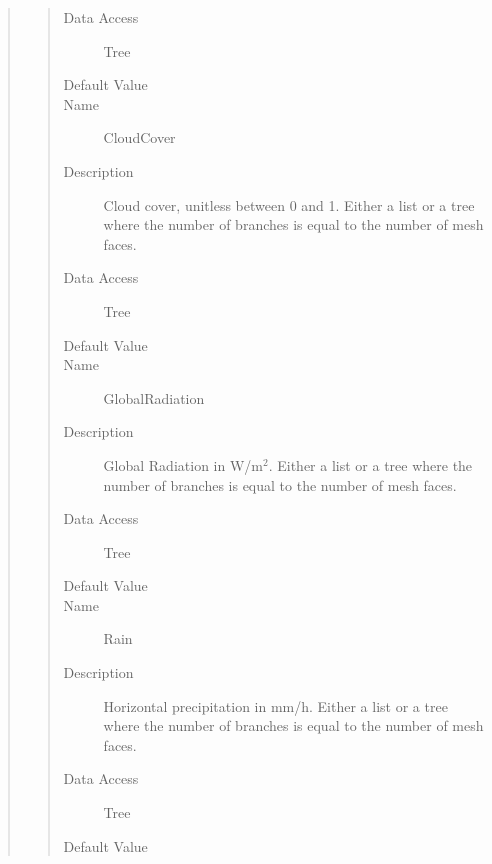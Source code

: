 \documentclass[letterpaper,10pt,english]{sphinxmanual}
\begin{document}
\begin{quote}
\begin{description}
\begin{quote}
\begin{description}
\item[{Data Access}] \leavevmode
Tree

\item[{Default Value}] \leavevmode
{}

\item[{Name}] \leavevmode
CloudCover

\item[{Description}] \leavevmode
Cloud cover, unitless between 0 and 1. Either a list or a tree where the number of branches is equal to the number
of mesh faces.

\item[{Data Access}] \leavevmode
Tree

\item[{Default Value}] \leavevmode
{}

\item[{Name}] \leavevmode
GlobalRadiation

\item[{Description}] \leavevmode
Global Radiation in W/m$^{\text{2}}$. Either a list or a tree where the number of branches is equal to the number
of mesh faces.

\item[{Data Access}] \leavevmode
Tree

\item[{Default Value}] \leavevmode
{}

\item[{Name}] \leavevmode
Rain

\item[{Description}] \leavevmode
Horizontal precipitation in mm/h. Either a list or a tree where the number of branches is equal to the number
of mesh faces.

\item[{Data Access}] \leavevmode
Tree

\item[{Default Value}] \leavevmode
{}


\end{description}
\end{quote}
\end{description}
\end{quote}
\end{document}
